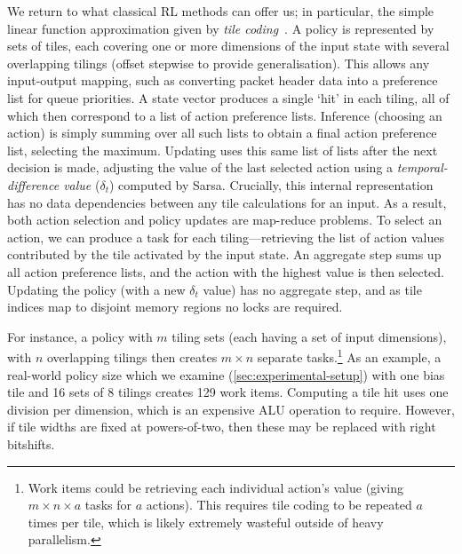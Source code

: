 \documentclass[
conference
,10pt
]{IEEEtran}
\begin{document}
We return to what classical RL methods can offer us; in particular, the simple linear function approximation given by \emph{tile coding}~\parencite[pp.\ \numrange{217}{221}]{RL2E}.
A policy is represented by sets of tiles, each covering one or more dimensions of the input state with several overlapping tilings (offset stepwise to provide generalisation).
This allows any input-output mapping, such as converting packet header data into a preference list for queue priorities.
A state vector produces a single `hit' in each tiling, all of which then correspond to a list of action preference lists.
Inference (choosing an action) is simply summing over all such lists to obtain a final action preference list, selecting the maximum.
Updating uses this same list of lists after the next decision is made, adjusting the value of the last selected action using a \emph{temporal-difference value} ($\delta_t$) computed by Sarsa.
Crucially, this internal representation has no data dependencies between any tile calculations for an input.
As a result, both action selection and policy updates are map-reduce problems.
To select an action, we can produce a task for each tiling---retrieving the list of action values contributed by the tile activated by the input state.
An aggregate step sums up all action preference lists, and the action with the highest value is then selected.
Updating the policy (with a new $\delta_t$ value) has no aggregate step, and as tile indices map to disjoint memory regions no locks are required.

For instance, a policy with $m$ tiling sets (each having a set of input dimensions), with $n$ overlapping tilings then creates $m \times n$ separate tasks.\footnote{Work items could be retrieving each individual action's value (giving $m \times n \times a$ tasks for $a$ actions). This requires tile coding to be repeated $a$ times per tile, which is likely extremely wasteful outside of heavy parallelism.}
As an example, a real-world policy size which we examine (\cref{sec:experimental-setup}) with one bias tile and \num{16} sets of \num{8} tilings creates \num{129} work items.
Computing a tile hit uses one division per dimension, which is an expensive ALU operation to require.
However, if tile widths are fixed at powers-of-two, then these may be replaced with right bitshifts.

\end{document}

